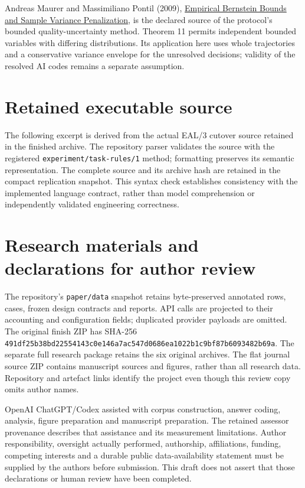 \documentclass[preprint,11pt]{elsarticle}
\begin{document}
Andreas Maurer and Massimiliano Pontil (2009),
\href{https://arxiv.org/abs/0907.3740}{Empirical Bernstein Bounds and
Sample Variance Penalization}, is the declared source of the protocol's
bounded quality-uncertainty method. Theorem 11 permits independent
bounded variables with differing distributions. Its application here
uses whole trajectories and a conservative variance envelope for the
unresolved decisions; validity of the resolved AI codes remains a
separate assumption.
\FloatBarrier
\appendix
\section{Retained executable source}
The following excerpt is derived from the actual EAL/3 cutover source retained
in the finished archive. The repository parser validates the source with the
registered \texttt{experiment/task-rules/1} method; formatting preserves its
semantic representation. The complete source and its archive hash are retained
in the compact replication snapshot. This syntax check establishes consistency
with the implemented language contract, rather than model comprehension or
independently validated engineering correctness.

\noindent\begin{minipage}{\linewidth}

\end{minipage}

\section{Research materials and declarations for author review}
The repository's \texttt{paper/data} snapshot retains byte-preserved annotated
rows, cases, frozen design contracts and reports. API calls are projected to
their accounting and configuration fields; duplicated provider payloads are
omitted. The original finish ZIP has SHA-256
\nolinkurl{491df25b38bd22554143c0e146a7ac547d0686ea1022b1c9bf87b6093482b69a}.
The separate full research package retains the six original archives. The
flat journal source ZIP contains manuscript sources and figures, rather than
all research data. Repository and artefact links identify the project even
though this review copy omits author names.

OpenAI ChatGPT/Codex assisted with corpus construction, answer coding,
analysis, figure preparation and manuscript preparation. The retained
assessor provenance describes that assistance and its measurement limitations.
Author responsibility, oversight actually performed, authorship, affiliations,
funding, competing interests and a durable public data-availability statement
must be supplied by the authors before submission. This draft does not assert
that those declarations or human review have been completed.
\end{document}
